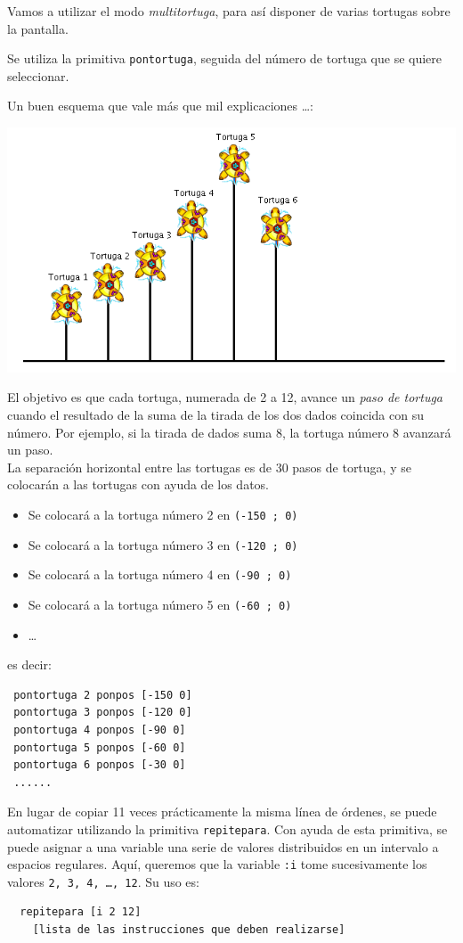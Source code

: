 \documentclass[12pt,twoside,spanish,a4paper]{report}
\begin{document}
Vamos a utilizar el modo \textit{multitortuga}, para as\'i disponer de varias
tortugas sobre la pantalla.

Se utiliza la primitiva \texttt{pontortuga}, seguida del n\'umero de tortuga que
se quiere seleccionar.

Un buen esquema que vale m\'as que mil explicaciones \dots:
\begin{center}
   \includegraphics[scale=0.4]{Imagenes_Tutorial/15_Dados.png} 
\end{center}
El objetivo es que cada tortuga, numerada de 2 a 12, avance un
\textit{paso de tortuga} cuando el resultado de la suma de la tirada de los
dos dados coincida con su n\'umero. Por ejemplo, si la tirada de dados 
suma 8, la tortuga n\'umero 8 avanzar\'a un paso. \\

La separaci\'on horizontal entre las tortugas es de 30 pasos de tortuga, y se
colocar\'an a las tortugas con ayuda de los datos.
\begin{itemize}
   \item Se colocar\'a a la tortuga n\'umero 2 en \texttt{(-150 ; 0)}
   \item Se colocar\'a a la tortuga n\'umero 3 en \texttt{(-120 ; 0)}
   \item Se colocar\'a a la tortuga n\'umero 4 en \texttt{(-90 ; 0)}
   \item Se colocar\'a a la tortuga n\'umero 5 en \texttt{(-60 ; 0)}
   \item \dots
\end{itemize}
es decir:
\begin{verbatim}
 pontortuga 2 ponpos [-150 0]
 pontortuga 3 ponpos [-120 0]
 pontortuga 4 ponpos [-90 0]
 pontortuga 5 ponpos [-60 0]
 pontortuga 6 ponpos [-30 0]
 ...... \end{verbatim}
En lugar de copiar 11 veces pr\'acticamente la misma l\'inea de \'ordenes,
se puede automatizar utilizando la primitiva \texttt{repitepara}. Con ayuda
de esta primitiva, se puede asignar a una variable una serie de valores
distribuidos en un intervalo a espacios regulares. Aqu\'i, queremos que la
variable \texttt{:i} tome sucesivamente los valores \texttt{2, 3, 4, \dots, 12}. 
Su uso es:
\begin{verbatim}
  repitepara [i 2 12]
    [lista de las instrucciones que deben realizarse]
\end{verbatim}
\end{document}
